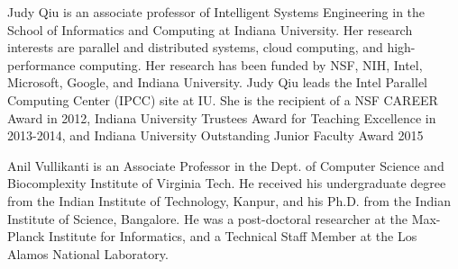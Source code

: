 \documentclass[10pt,journal,compsoc]{IEEEtran}
\begin{document}
\begin{IEEEbiography}{Judy Qiu}
 is an associate professor of Intelligent Systems Engineering in the
School of Informatics and Computing at Indiana University. Her research
interests are parallel and distributed systems, cloud computing, and
high-performance computing. Her research has been funded by NSF, NIH, Intel,
Microsoft, Google, and Indiana University. Judy Qiu leads the Intel Parallel
Computing Center (IPCC) site at IU. She is the recipient of a NSF CAREER Award
in 2012, Indiana University Trustees Award for Teaching Excellence in 2013-2014,
and Indiana University Outstanding Junior Faculty Award 2015
\end{IEEEbiography}

\begin{IEEEbiography}{Anil Vullikanti}
 is an Associate Professor in the Dept. of Computer
Science and Biocomplexity Institute of Virginia Tech. He received his
undergraduate degree from the Indian Institute of Technology, Kanpur, and his
Ph.D. from the Indian Institute of Science, Bangalore. He was a post-doctoral
researcher at the Max-Planck Institute for Informatics, and a Technical Staff
Member at the Los Alamos National Laboratory.
\end{IEEEbiography}








\end{document}
